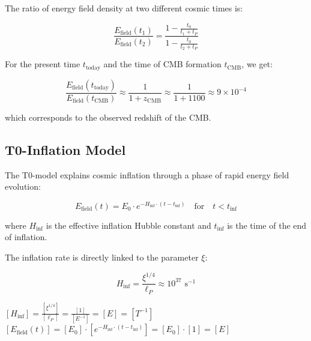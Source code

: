 \documentclass[12pt,a4paper]{article}
\theoremstyle{definition}
\begin{document}
	\begin{verhaltnis}
		The ratio of energy field density at two different cosmic times is:
		
		\begin{equation}
			\frac{E_{\text{field}}(t_1)}{E_{\text{field}}(t_2)} = \frac{1 - \frac{t_0}{t_1 + t_P}}{1 - \frac{t_0}{t_2 + t_P}}
		\end{equation}
		
		For the present time $t_{\text{today}}$ and the time of CMB formation $t_{\text{CMB}}$, we get:
		
		\begin{equation}
			\frac{E_{\text{field}}(t_{\text{today}})}{E_{\text{field}}(t_{\text{CMB}})} \approx \frac{1}{1 + z_{\text{CMB}}} \approx \frac{1}{1 + 1100} \approx 9 \times 10^{-4}
		\end{equation}
		
		which corresponds to the observed redshift of the CMB.
	\end{verhaltnis}
	
	\subsection{T0-Inflation Model}
	
	The T0-model explains cosmic inflation through a phase of rapid energy field evolution:
	
	\begin{equation}
		E_{\text{field}}(t) = E_0 \cdot e^{-H_{\text{inf}} \cdot (t - t_{\text{inf}})} \quad \text{for} \quad t < t_{\text{inf}}
	\end{equation}
	
	where $H_{\text{inf}}$ is the effective inflation Hubble constant and $t_{\text{inf}}$ is the time of the end of inflation.
	
	The inflation rate is directly linked to the parameter $\xi$:
	
	\begin{equation}
		H_{\text{inf}} = \frac{\xi^{1/4}}{\ell_P} \approx 10^{37} \text{ s}^{-1}
	\end{equation}
	
	\begin{einheitencheck}
		$[H_{\text{inf}}] = \frac{[\xi^{1/4}]}{[\ell_P]} = \frac{[1]}{[E^{-1}]} = [E] = [T^{-1}]$ \checkmark\\
		$[E_{\text{field}}(t)] = [E_0] \cdot [e^{-H_{\text{inf}} \cdot (t - t_{\text{inf}})}] = [E_0] \cdot [1] = [E]$ \checkmark
	\end{einheitencheck}
	
\end{document}
